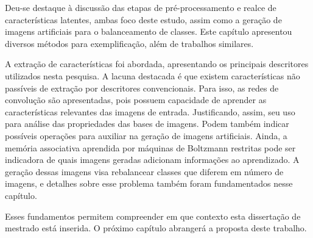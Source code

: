 Deu-se destaque à discussão das etapas de pré-processamento e realce de características latentes, ambas foco deste estudo, assim como a geração de imagens artificiais para o balanceamento de classes. Este capítulo apresentou diversos métodos para exemplificação, além de trabalhos similares.

A extração de características foi abordada, apresentando os principais descritores utilizados nesta pesquisa. A lacuna destacada é que existem características não passíveis de extração por descritores convencionais. Para isso, as redes de convolução são apresentadas, pois possuem capacidade de aprender as características relevantes das imagens de entrada. Justificando, assim, seu uso para análise das propriedades das bases de imagens. Podem também indicar possíveis operações para auxiliar na geração de imagens artificiais. Ainda, a memória associativa aprendida por máquinas de Boltzmann restritas pode ser indicadora de quais imagens geradas adicionam informações ao aprendizado. A geração dessas imagens visa rebalancear classes que diferem em número de imagens, e detalhes sobre esse problema também foram fundamentados nesse capítulo.

Esses fundamentos permitem compreender em que contexto esta dissertação de mestrado está inserida. O próximo capítulo abrangerá a proposta deste trabalho.
